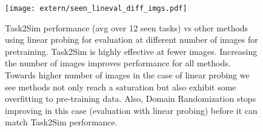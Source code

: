 \begin{figure}[h]
    \centering
    \texttt{[image: extern/seen\_lineval\_diff\_imgs.pdf]}
    \caption{Task2Sim performance (avg over 12 seen tasks) vs other methods using linear probing for evaluation at different number of images for pretraining. Task2Sim is highly effective at fewer images. Increasing the number of images improves performance for all methods. Towards higher number of images in the case of linear probing we see methods not only reach a saturation but also exhibit some overfitting to pre-training data. Also, Domain Randomization stops improving in this case (evaluation with linear probing) before it can match Task2Sim performance.}
    \label{fig:diff_num_imgs_lineval}
\end{figure}